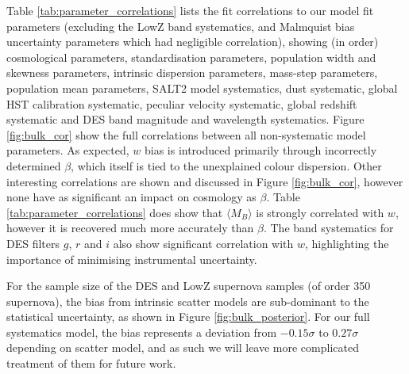 \documentclass[a4paper,fleqn,usenatbib]{mnras}
\begin{document}
Table \ref{tab:parameter_correlations} lists the fit correlations to our model fit parameters (excluding the LowZ band systematics, and Malmquist bias uncertainty parameters which had negligible correlation), showing (in order) cosmological parameters, standardisation parameters, population width and skewness parameters, intrinsic dispersion parameters, mass-step parameters, population mean parameters, SALT2 model systematics, dust systematic, global HST calibration systematic, peculiar velocity systematic, global redshift systematic and DES band magnitude and wavelength systematics. Figure \ref{fig:bulk_cor} show the full correlations between all non-systematic model parameters. As expected, $w$ bias is introduced primarily through incorrectly determined $\beta$, which itself is tied to the unexplained colour dispersion. Other interesting correlations are shown and discussed in Figure \ref{fig:bulk_cor}, however none have as significant an impact on cosmology as $\beta$. Table \ref{tab:parameter_correlations} does show that $\langle M_B \rangle$ is strongly correlated with $w$, however it is recovered much more accurately than $\beta$. The band systematics for DES filters $g$, $r$ and $i$ also show significant correlation with $w$, highlighting the importance of minimising instrumental uncertainty.


For the sample size of the DES and LowZ supernova samples (of order 350 supernova), the bias from intrinsic scatter models are sub-dominant to the statistical uncertainty, as shown in Figure \ref{fig:bulk_posterior}. For our full systematics model, the bias represents a deviation from $-0.15\sigma$ to $0.27\sigma$ depending on scatter model, and as such we will leave more complicated treatment of them for future work.
\end{document}
